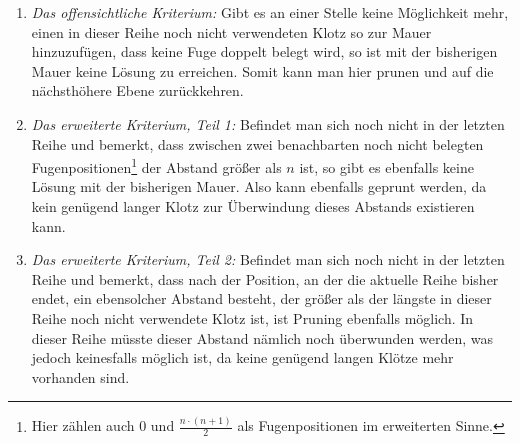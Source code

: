 \documentclass[a4paper, notitlepage, 12pt]{scrartcl}
\begin{document}
\begin{enumerate}
\item \textit{Das offensichtliche Kriterium:} Gibt es an einer Stelle keine Möglichkeit mehr, einen in dieser Reihe noch nicht verwendeten Klotz so zur Mauer hinzuzufügen, dass keine Fuge doppelt belegt wird, so ist mit der bisherigen Mauer keine Lösung zu erreichen. Somit kann man hier prunen und auf die nächsthöhere Ebene zurückkehren.
\item \textit{Das erweiterte Kriterium, Teil 1:} Befindet man sich noch nicht in der letzten Reihe und bemerkt, dass zwischen zwei benachbarten noch nicht belegten Fugenpositionen\footnote{Hier zählen auch 0 und $\frac{n \cdot (n+1) }{2}$ als Fugenpositionen im erweiterten Sinne.} der Abstand größer als $n$ ist, so gibt es ebenfalls keine Lösung mit der bisherigen Mauer. Also kann ebenfalls geprunt werden, da kein genügend langer Klotz zur Überwindung dieses Abstands existieren kann.
\item \textit{Das erweiterte Kriterium, Teil 2:} Befindet man sich noch nicht in der letzten Reihe und bemerkt, dass nach der Position, an der die aktuelle Reihe bisher endet, ein ebensolcher Abstand besteht, der größer als der längste in dieser Reihe noch nicht verwendete Klotz ist, ist Pruning ebenfalls möglich. In dieser Reihe müsste dieser Abstand nämlich noch überwunden werden, was jedoch keinesfalls möglich ist, da keine genügend langen Klötze mehr vorhanden sind.
\end{enumerate}
\end{document}
